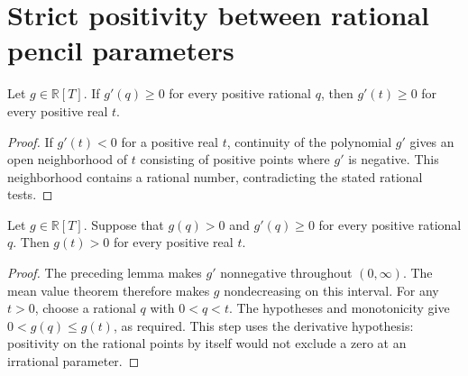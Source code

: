 \section{Strict positivity between rational pencil parameters}

\begin{lemma}
\label{lem:nef-ample-polynomial-rational-derivative-nonnegative}
\leanok
Let $g\in\mathbb R[T]$. If $g'(q)\geq0$ for every positive rational
$q$, then $g'(t)\geq0$ for every positive real $t$.
\end{lemma}
\begin{proof}
If $g'(t)<0$ for a positive real $t$, continuity of the polynomial
$g'$ gives an open neighborhood of $t$ consisting of positive points
where $g'$ is negative. This neighborhood contains a rational number,
contradicting the stated rational tests.
\end{proof}

\begin{theorem}
\label{thm:nef-ample-polynomial-real-positivity}
\leanok
{}
Let $g\in\mathbb R[T]$. Suppose that $g(q)>0$ and $g'(q)\geq0$
for every positive rational $q$. Then $g(t)>0$ for every positive
real $t$.
\end{theorem}
\begin{proof}
The preceding lemma makes $g'$ nonnegative throughout $(0,\infty)$.
The mean value theorem therefore makes $g$ nondecreasing on this interval.
For any $t>0$, choose a rational $q$ with $0<q<t$. The hypotheses and
monotonicity give $0<g(q)\leq g(t)$, as required. This step uses the
derivative hypothesis: positivity on the rational points by itself would
not exclude a zero at an irrational parameter.
\end{proof}
